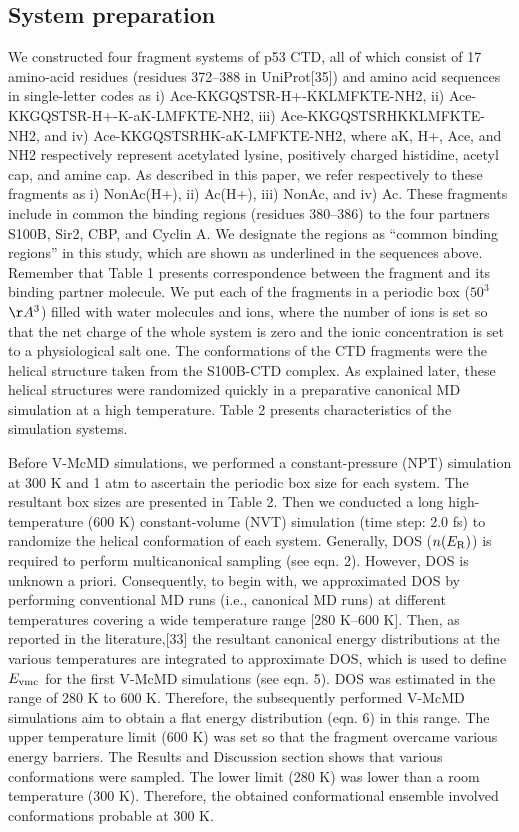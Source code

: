 \subsection{System preparation}
We constructed four fragment systems of p53 CTD, all of which consist of 17 amino-acid residues (residues 372–388 in UniProt[35]) and amino acid sequences in single-letter codes as i) Ace-KKGQSTSR-H+-KKLMFKTE-NH2, ii) Ace-KKGQSTSR-H+-K-aK-LMFKTE-NH2, iii) Ace-KKGQSTSRHKKLMFKTE-NH2, and iv) Ace-KKGQSTSRHK-aK-LMFKTE-NH2, where aK, H+, Ace, and NH2 respectively represent acetylated lysine, positively charged histidine, acetyl cap, and amine cap. 
As described in this paper, we refer respectively to these fragments as i) NonAc(H+), ii) Ac(H+), iii) NonAc, and iv) Ac. These fragments include in common the binding regions (residues 380–386) to the four partners S100B, Sir2, CBP, and Cyclin A. 
We designate the regions as “common binding regions” in this study, which are shown as underlined in the sequences above. 
Remember that {\color{red}Table 1} presents correspondence between the fragment and its binding partner molecule.
We put each of the fragments in a periodic box ($50^3$ $\AA^3$) filled with water molecules and ions, where the number of ions is set so that the net charge of the whole system is zero and the ionic concentration is set to a physiological salt one. The conformations of the CTD fragments were the helical structure taken from the S100B-CTD complex. As explained later, these helical structures were randomized quickly in a preparative canonical MD simulation at a high temperature. Table 2 presents characteristics of the simulation systems.

Before V-McMD simulations, we performed a constant-pressure (NPT) simulation at 300 K and 1 atm to ascertain the periodic box size for each system. The resultant box sizes are presented in Table 2. Then we conducted a long high-temperature (600 K) constant-volume (NVT) simulation (time step: 2.0 fs) to randomize the helical conformation of each system.
Generally, DOS ($n(E_{\rm R})$) is required to perform multicanonical sampling (see eqn. 2). However, DOS is unknown a priori. Consequently, to begin with, we approximated DOS by performing conventional MD runs (i.e., canonical MD runs) at different temperatures covering a wide temperature range [280 K–600 K]. Then, as reported in the literature,[33] the resultant canonical energy distributions at the various temperatures are integrated to approximate DOS, which is used to define $E_{\rm vmc}$ for the first V-McMD simulations (see eqn. 5). DOS was estimated in the range of 280 K to 600 K. Therefore, the subsequently performed V-McMD simulations aim to obtain a flat energy distribution (eqn. 6) in this range. The upper temperature limit (600 K) was set so that the fragment overcame various energy barriers. The Results and Discussion section shows that various conformations were sampled. The lower limit (280 K) was lower than a room temperature (300 K). Therefore, the obtained conformational ensemble involved conformations probable at 300 K.

